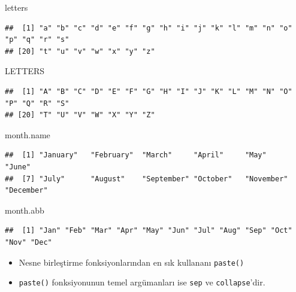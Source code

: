 \documentclass[
  oneside]{book}
\newenvironment{Shaded}{\begin{snugshade}}{\end{snugshade}}
\newcommand{\NormalTok}[1]{#1}
\providecommand{\tightlist}{%
  \setlength{\itemsep}{0pt}\setlength{\parskip}{0pt}}
\begin{document}
\begin{Shaded}
\begin{Highlighting}[]
\NormalTok{letters}
\end{Highlighting}
\end{Shaded}

\begin{verbatim}
##  [1] "a" "b" "c" "d" "e" "f" "g" "h" "i" "j" "k" "l" "m" "n" "o" "p" "q" "r" "s"
## [20] "t" "u" "v" "w" "x" "y" "z"
\end{verbatim}

\begin{Shaded}
\begin{Highlighting}[]
\NormalTok{LETTERS}
\end{Highlighting}
\end{Shaded}

\begin{verbatim}
##  [1] "A" "B" "C" "D" "E" "F" "G" "H" "I" "J" "K" "L" "M" "N" "O" "P" "Q" "R" "S"
## [20] "T" "U" "V" "W" "X" "Y" "Z"
\end{verbatim}

\begin{Shaded}
\begin{Highlighting}[]
\NormalTok{month.name}
\end{Highlighting}
\end{Shaded}

\begin{verbatim}
##  [1] "January"   "February"  "March"     "April"     "May"       "June"     
##  [7] "July"      "August"    "September" "October"   "November"  "December"
\end{verbatim}

\begin{Shaded}
\begin{Highlighting}[]
\NormalTok{month.abb}
\end{Highlighting}
\end{Shaded}

\begin{verbatim}
##  [1] "Jan" "Feb" "Mar" "Apr" "May" "Jun" "Jul" "Aug" "Sep" "Oct" "Nov" "Dec"
\end{verbatim}

\begin{itemize}
\tightlist
\item
  Nesne birleştirme fonksiyonlarından en sık kullananı \texttt{paste()}
\item
  \texttt{paste()} fonksiyonunun temel argümanları ise \texttt{sep} ve \texttt{collapse}'dir.
\end{itemize}
\end{document}
